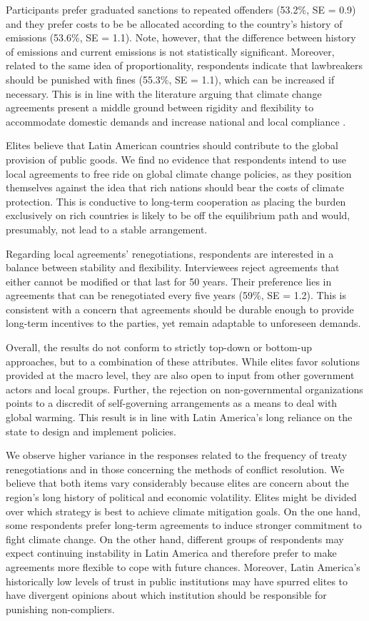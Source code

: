\documentclass[a4paper,12pt]{article}
\begin{document}
Participants prefer graduated sanctions to repeated offenders (53.2\%, SE = 0.9) and they prefer costs to be be allocated according to the country's history of emissions (53.6\%, SE = 1.1). Note, however, that the difference between history of emissions and current emissions is not statistically significant. Moreover, related to the same idea of proportionality, respondents indicate that lawbreakers should be punished with fines (55.3\%, SE = 1.1), which can be increased if necessary. This is in line with the literature arguing that climate change agreements present a middle ground between rigidity and flexibility to accommodate domestic demands and increase national and local compliance \citep{von2008international}.

Elites believe that Latin American countries should contribute to the global provision of public goods. We find no evidence that respondents intend to use local agreements to free ride on global climate change policies, as they position themselves against the idea that rich nations should bear the costs of climate protection. This is conductive to long-term cooperation as placing the burden exclusively on rich countries is likely to be off the equilibrium path and would, presumably, not lead to a stable arrangement.

Regarding local agreements' renegotiations, respondents are interested in a balance between stability and flexibility. Interviewees reject agreements that either cannot be modified or that last for 50 years. Their preference lies in agreements that can be renegotiated every five years (59\%, SE = 1.2). This is consistent with a concern that agreements should be durable enough to provide long-term incentives to the parties, yet remain adaptable to unforeseen demands.

Overall, the results do not conform to strictly top-down or bottom-up approaches, but to a combination of these attributes. While elites favor solutions provided at the macro level, they are also open to input from other government actors and local groups. Further, the rejection on non-governmental organizations points to a discredit of self-governing arrangements as a means to deal with global warming. This result is in line with Latin America's long reliance on the state to design and implement policies.

We observe higher variance in the responses related to the frequency of treaty renegotiations and in those concerning the methods of conflict resolution. We believe that both items vary considerably because elites are concern about the region's long history of political and economic volatility. Elites might be divided over which strategy is best to achieve climate mitigation goals. On the one hand, some respondents prefer long-term agreements to induce stronger commitment to fight climate change. On the other hand, different groups of respondents may expect continuing instability in Latin America and therefore prefer to make agreements more flexible to cope with future chances. Moreover, Latin America's historically low levels of trust in public institutions may have spurred elites to have divergent opinions about which institution should be responsible for punishing non-compliers. 
\end{document}
